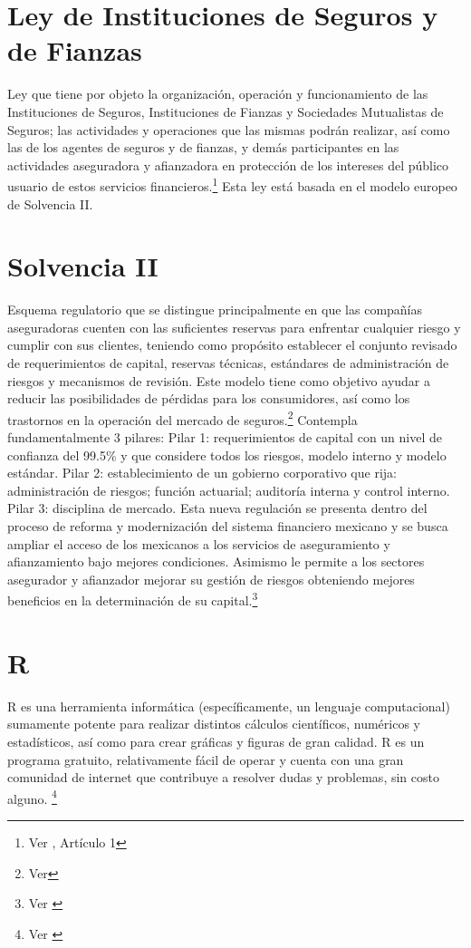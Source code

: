 \documentclass[11pt,twoside,openright,spanish]{report}
\numberwithin{equation}{chapter}
\numberwithin{figure}{chapter}
\numberwithin{table}{chapter}
\begin{document}
	\section{Ley de Instituciones de Seguros y de Fianzas}
	\doublespacing
	Ley que tiene por objeto la organización, operación y funcionamiento de las Instituciones de Seguros, Instituciones de Fianzas y Sociedades Mutualistas de Seguros; las actividades y operaciones que las mismas podrán realizar, así como las de los agentes de seguros y de fianzas, y demás participantes en las actividades aseguradora y afianzadora en protección de los intereses del público usuario de estos servicios financieros.\footnote{Ver \citet{GLisf}, Artículo 1} Esta ley está basada en el modelo europeo de Solvencia II.
	
    \section{Solvencia II}
	\doublespacing
	Esquema regulatorio que se distingue principalmente en que las compañías aseguradoras cuenten con las suficientes reservas para enfrentar cualquier riesgo y cumplir con sus clientes, teniendo como propósito establecer el conjunto revisado de requerimientos de capital, reservas técnicas, estándares de administración de riesgos y mecanismos de revisión. Este modelo tiene como objetivo ayudar a reducir las posibilidades de pérdidas para los consumidores, así como los trastornos en la operación del mercado de seguros.\footnote{Ver\citet{JSolvenciaII}} Contempla fundamentalmente 3 pilares:
	Pilar 1: requerimientos de capital con un nivel de confianza del 99.5\% y que considere todos los riesgos, modelo interno y modelo estándar.
	Pilar 2: establecimiento de un gobierno corporativo que rija: administración de riesgos; función actuarial; auditoría interna y control interno.
	Pilar 3: disciplina de mercado. 
	Esta nueva regulación se presenta dentro del proceso de reforma y modernización del sistema financiero mexicano y se busca ampliar el acceso de los mexicanos a los servicios de aseguramiento y afianzamiento bajo mejores condiciones. Asimismo le permite a los sectores asegurador y afianzador mejorar su gestión de riesgos obteniendo mejores beneficios en la determinación de su capital.\footnote{Ver \citet{KPilaresSolvenciaII}} 
	
	
	\section{R}
	\doublespacing
R es una herramienta informática (específicamente, un lenguaje computacional) sumamente potente para realizar distintos cálculos científicos, numéricos y estadísticos, así como para crear gráficas y figuras de gran calidad. R es un programa gratuito, relativamente fácil de operar y cuenta con una gran comunidad de internet que contribuye a resolver dudas y problemas, sin costo alguno. \footnote{Ver \citet{KR}}
	
\end{document}
